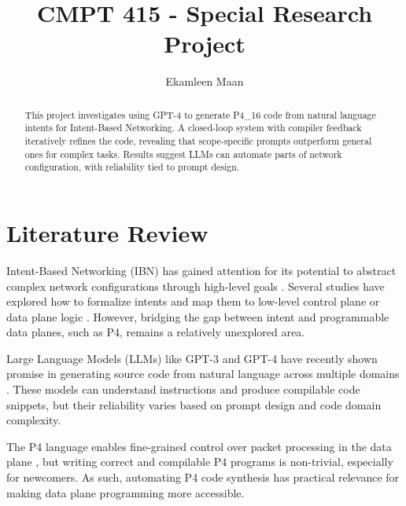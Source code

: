 \documentclass[sigconf]{acmart}
\begin{document}
\fancyhead{}
\title{CMPT 415 - Special Research Project}
\author{Ekamleen Maan}


\begin{abstract}
This project investigates using GPT-4 to generate P4\_16 code from natural language intents for Intent-Based Networking. A closed-loop system with compiler feedback iteratively refines the code, revealing that scope-specific prompts outperform general ones for complex tasks. Results suggest LLMs can automate parts of network configuration, with reliability tied to prompt design.
\end{abstract}



\maketitle

\section{Literature Review}

Intent-Based Networking (IBN) has gained attention for its potential to abstract complex network configurations through high-level goals \cite{jain_ibn}. Several studies have explored how to formalize intents and map them to low-level control plane or data plane logic \cite{levin_ibn_survey}. However, bridging the gap between intent and programmable data planes, such as P4, remains a relatively unexplored area.

Large Language Models (LLMs) like GPT-3 and GPT-4 have recently shown promise in generating source code from natural language across multiple domains \cite{chen_codex}. These models can understand instructions and produce compilable code snippets, but their reliability varies based on prompt design and code domain complexity.

The P4 language enables fine-grained control over packet processing in the data plane \cite{bosshart_p4}, but writing correct and compilable P4 programs is non-trivial, especially for newcomers. As such, automating P4 code synthesis has practical relevance for making data plane programming more accessible.
\end{document}
